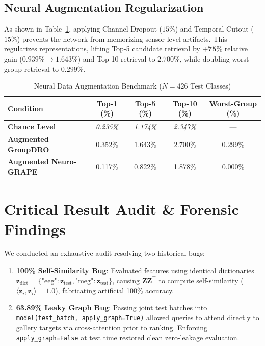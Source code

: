 \documentclass[conference]{IEEEtran}
\begin{document}
\subsection{Neural Augmentation Regularization}
As shown in Table~\ref{tab:augmentation}, applying Channel Dropout ($15\%$) and Temporal Cutout ($15\%$) prevents the network from memorizing sensor-level artifacts. This regularizes representations, lifting Top-5 candidate retrieval by $\mathbf{+75\%}$ relative gain ($0.939\% \to \mathbf{1.643\%}$) and Top-10 retrieval to $\mathbf{2.700\%}$, while doubling worst-group retrieval to $\mathbf{0.299\%}$.

\begin{table}[t]
\centering
\caption{Neural Data Augmentation Benchmark ($N = 426$ Test Classes)}
\label{tab:augmentation}
\begin{tabular}{lcccc}
\toprule
\textbf{Condition} & \textbf{Top-1 (\%)} & \textbf{Top-5 (\%)} & \textbf{Top-10 (\%)} & \textbf{Worst-Group (\%)} \\
\midrule
\textbf{Chance Level} & \emph{0.235\%} & \emph{1.174\%} & \emph{2.347\%} & --- \\
\textbf{Augmented GroupDRO} & $\mathbf{0.352\%}$ & $\mathbf{1.643\%}$ & $\mathbf{2.700\%}$ & $\mathbf{0.299\%}$ \\
\textbf{Augmented Neuro-GRAPE} & 0.117\% & 0.822\% & 1.878\% & 0.000\% \\
\bottomrule
\end{tabular}
\end{table}

\section{Critical Result Audit \& Forensic Findings}

We conducted an exhaustive audit resolving two historical bugs:
\begin{enumerate}
    \item \textbf{100\% Self-Similarity Bug}: Evaluated features using identical dictionaries $\mathbf{z}_{\text{dict}} = \{\text{"eeg"}: \mathbf{z}_{\text{test}}, \text{"meg"}: \mathbf{z}_{\text{test}}\}$, causing $\mathbf{Z} \mathbf{Z}^\top$ to compute self-similarity ($\langle \mathbf{z}_i, \mathbf{z}_i \rangle = 1.0$), fabricating artificial 100\% accuracy.
    \item \textbf{63.89\% Leaky Graph Bug}: Passing joint test batches into \texttt{model(test\_batch, apply\_graph=True)} allowed queries to attend directly to gallery targets via cross-attention prior to ranking. Enforcing \texttt{apply\_graph=False} at test time restored clean zero-leakage evaluation.
\end{enumerate}
\end{document}

